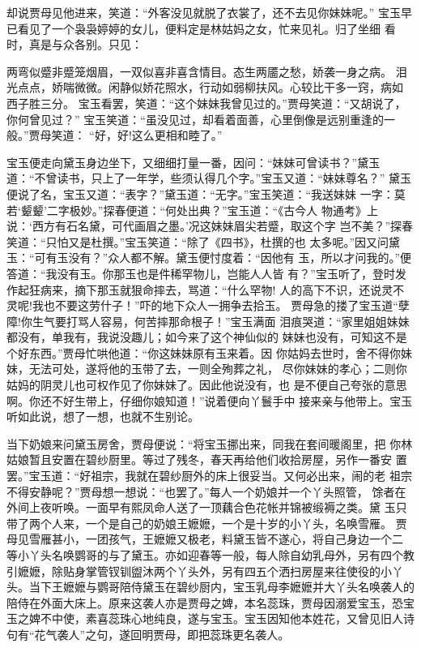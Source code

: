 却说贾母见他进来，笑道：“外客没见就脱了衣裳了，还不去见你妹妹呢。”
宝玉早已看见了一个袅袅婷婷的女儿，便料定是林姑妈之女，忙来见礼。归了坐细
看时，真是与众各别。只见：

两弯似蹙非蹙笼烟眉，一双似喜非喜含情目。态生两靥之愁，娇袭一身之病。
泪光点点，娇喘微微。闲静似娇花照水，行动如弱柳扶风。心较比干多一窍，病如
西子胜三分。
宝玉看罢，笑道：“这个妹妹我曾见过的。”贾母笑道：“又胡说了，你何曾见过？”
宝玉笑道：“虽没见过，却看着面善，心里倒像是远别重逢的一般。”贾母笑道：
“好，好!这么更相和睦了。”

宝玉便走向黛玉身边坐下，又细细打量一番，因问：“妹妹可曾读书？”黛玉
道：“不曾读书，只上了一年学，些须认得几个字。”宝玉又道：“妹妹尊名？”
黛玉便说了名，宝玉又道：“表字？”黛玉道：“无字。”宝玉笑道：“我送妹妹
一字：莫若‘颦颦’二字极妙。”探春便道：“何处出典？”宝玉道：“《古今人
物通考》上说：‘西方有石名黛，可代画眉之墨。’况这妹妹眉尖若蹙，取这个字
岂不美？”探春笑道：“只怕又是杜撰。”宝玉笑道：“除了《四书》，杜撰的也
太多呢。”因又问黛玉：“可有玉没有？”众人都不解。黛玉便忖度着：“因他有
玉，所以才问我的。”便答道：“我没有玉。你那玉也是件稀罕物儿，岂能人人皆
有？”宝玉听了，登时发作起狂病来，摘下那玉就狠命摔去，骂道：“什么罕物!
人的高下不识，还说灵不灵呢!我也不要这劳什子！”吓的地下众人一拥争去拾玉。
贾母急的搂了宝玉道“孽障!你生气要打骂人容易，何苦摔那命根子！”宝玉满面
泪痕哭道：“家里姐姐妹妹都没有，单我有，我说没趣儿；如今来了这个神仙似的
妹妹也没有，可知这不是个好东西。”贾母忙哄他道：“你这妹妹原有玉来着。因
你姑妈去世时，舍不得你妹妹，无法可处，遂将他的玉带了去，一则全殉葬之礼，
尽你妹妹的孝心；二则你姑妈的阴灵儿也可权作见了你妹妹了。因此他说没有，也
是不便自己夸张的意思啊。你还不好生带上，仔细你娘知道！”说着便向丫鬟手中
接来亲与他带上。宝玉听如此说，想了一想，也就不生别论。

当下奶娘来问黛玉房舍，贾母便说：“将宝玉挪出来，同我在套间暖阁里，把
你林姑娘暂且安置在碧纱厨里。等过了残冬，春天再给他们收拾房屋，另作一番安
置罢。”宝玉道：“好祖宗，我就在碧纱厨外的床上很妥当。又何必出来，闹的老
祖宗不得安静呢？”贾母想一想说：“也罢了。”每人一个奶娘并一个丫头照管，
馀者在外间上夜听唤。一面早有熙凤命人送了一顶藕合色花帐并锦被缎褥之类。黛
玉只带了两个人来，一个是自己的奶娘王嬷嬷，一个是十岁的小丫头，名唤雪雁。
贾母见雪雁甚小，一团孩气，王嬷嬷又极老，料黛玉皆不遂心，将自己身边一个二
等小丫头名唤鹦哥的与了黛玉。亦如迎春等一般，每人除自幼乳母外，另有四个教
引嬷嬷，除贴身掌管钗钏盥沐两个丫头外，另有四五个洒扫房屋来往使役的小丫
头。当下王嬷嬷与鹦哥陪侍黛玉在碧纱厨内，宝玉乳母李嬷嬷并大丫头名唤袭人的
陪侍在外面大床上。原来这袭人亦是贾母之婢，本名蕊珠，贾母因溺爱宝玉，恐宝
玉之婢不中使，素喜蕊珠心地纯良，遂与宝玉。宝玉因知他本姓花，又曾见旧人诗
句有“花气袭人”之句，遂回明贾母，即把蕊珠更名袭人。

